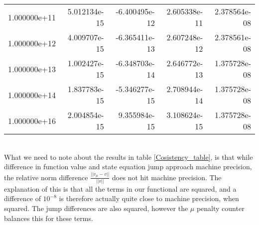 \begin{table}[h]
\begin{tabular}{lrrrr}
1.000000e+11 &      5.012134e-15 &            -6.400495e-12 &  2.605338e-11 &  2.378564e-08 \\
1.000000e+12 &      4.009707e-15 &            -6.365411e-13 &  2.607248e-12 &  2.378561e-08 \\
1.000000e+13 &      1.002427e-15 &            -6.348703e-14 &  2.646772e-13 &  1.375728e-08 \\
1.000000e+14 &      1.837783e-15 &            -5.346277e-15 &  2.708944e-14 &  1.375728e-08 \\
1.000000e+16 &      2.004854e-15 &             9.355984e-15 &  3.108624e-15 &  1.375728e-08 \\
\bottomrule
\end{tabular}
\end{table}
\\
What we need to note about the results in table \ref{Cosistency_table}, is that while difference in function value and state equation jump approach machine precision, the relative norm difference $\frac{||v_{\mu}-v||}{||v||}$ does not hit machine precision. The explanation of this is that all the terms in our functional are squared, and a difference of $10^{-8}$ is therefore actually quite close to machine precision, when squared. The jump differences are also squared, however the $\mu$ penalty counter balances this for these terms.
